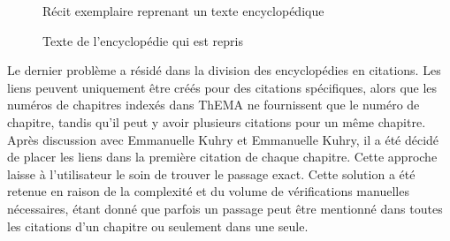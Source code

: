  \begin{figure}[H]
	\centering
	\caption{Récit exemplaire reprenant un texte encyclopédique}
\end{figure}

 \begin{figure}[H]
	\centering
	\caption{Texte de l'encyclopédie qui est repris}
\end{figure}

Le dernier problème a résidé dans la division des encyclopédies en citations. Les liens peuvent uniquement être créés pour des citations spécifiques, alors que les numéros de chapitres indexés dans ThEMA ne fournissent que le numéro de chapitre, tandis qu'il peut y avoir plusieurs citations pour un même chapitre. Après discussion avec Emmanuelle Kuhry et Emmanuelle Kuhry, il a été décidé de placer les liens dans la première citation de chaque chapitre. Cette approche laisse à l'utilisateur le soin de trouver le passage exact. Cette solution a été retenue en raison de la complexité et du volume de vérifications manuelles nécessaires, étant donné que parfois un passage peut être mentionné dans toutes les citations d'un chapitre ou seulement dans une seule.